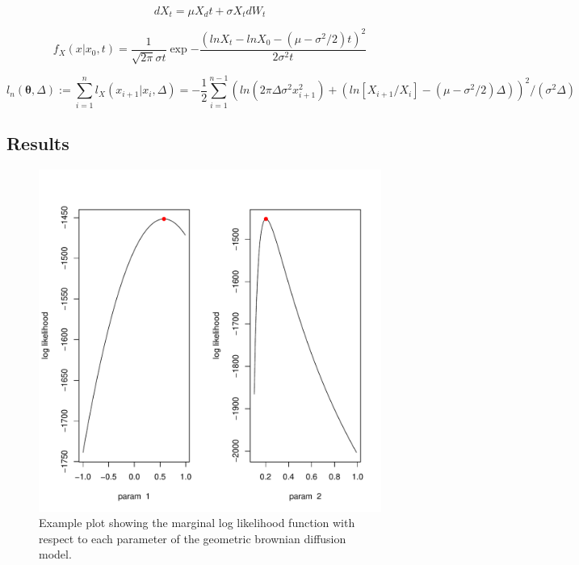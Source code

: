 \documentclass{article}
\newcommand{\be}{\begin{equation}}
\newcommand{\ee}{\end{equation}}
\begin{document}
\be
dX_t = \mu X_dt + \sigma X_t dW_t
\ee

\be
f_X(x|x_0,t) = \frac{1}{\sqrt{2\pi}\sigma t}\exp{-\frac{(ln X_t  - ln X_0 - (\mu -\sigma^2/2)t)^2}{2\sigma^2t}}
\ee

\be
l_n(\mathbf{\theta}, \Delta) :=\sum_{i=1}^n l_X(x_{i+1}|x_i, \Delta)=-\frac{1}{2}\sum_{i=1}^{n-1}(ln(2\pi\Delta\sigma^2x_{i+1}^2) + (ln[X_{i+1}/X_{i}] - (\mu-\sigma^2/2)\Delta))^2/(\sigma^2\Delta)
\ee

\subsection{Results}

\begin{figure}
\includegraphics[scale=0.8]{../figures/MLE_GBM.pdf}
\caption{Example plot showing the marginal log likelihood function with respect to each parameter of the geometric brownian diffusion model.}
\end{figure}
\end{document}
